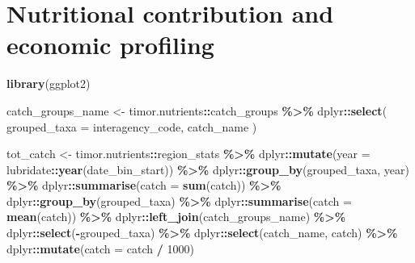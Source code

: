 \documentclass[
]{book}
\newenvironment{Shaded}{\begin{snugshade}}{\end{snugshade}}
\newcommand{\AttributeTok}[1]{\textcolor[rgb]{0.13,0.29,0.53}{#1}}
\newcommand{\DecValTok}[1]{\textcolor[rgb]{0.00,0.00,0.81}{#1}}
\newcommand{\FunctionTok}[1]{\textcolor[rgb]{0.13,0.29,0.53}{\textbf{#1}}}
\newcommand{\NormalTok}[1]{#1}
\newcommand{\OtherTok}[1]{\textcolor[rgb]{0.56,0.35,0.01}{#1}}
\newcommand{\SpecialCharTok}[1]{\textcolor[rgb]{0.81,0.36,0.00}{\textbf{#1}}}
\begin{document}
\chapter{Nutritional contribution and economic profiling}\label{distribution}

\begin{Shaded}
\begin{Highlighting}[]
\FunctionTok{library}\NormalTok{(ggplot2)}


\NormalTok{catch\_groups\_name }\OtherTok{\textless{}{-}}
\NormalTok{  timor.nutrients}\SpecialCharTok{::}\NormalTok{catch\_groups }\SpecialCharTok{\%\textgreater{}\%}
\NormalTok{  dplyr}\SpecialCharTok{::}\FunctionTok{select}\NormalTok{(}
    \AttributeTok{grouped\_taxa =}\NormalTok{ interagency\_code,}
\NormalTok{    catch\_name}
\NormalTok{  )}

\NormalTok{tot\_catch }\OtherTok{\textless{}{-}}
\NormalTok{  timor.nutrients}\SpecialCharTok{::}\NormalTok{region\_stats }\SpecialCharTok{\%\textgreater{}\%}
\NormalTok{  dplyr}\SpecialCharTok{::}\FunctionTok{mutate}\NormalTok{(}\AttributeTok{year =}\NormalTok{ lubridate}\SpecialCharTok{::}\FunctionTok{year}\NormalTok{(date\_bin\_start)) }\SpecialCharTok{\%\textgreater{}\%}
\NormalTok{  dplyr}\SpecialCharTok{::}\FunctionTok{group\_by}\NormalTok{(grouped\_taxa, year) }\SpecialCharTok{\%\textgreater{}\%}
\NormalTok{  dplyr}\SpecialCharTok{::}\FunctionTok{summarise}\NormalTok{(}\AttributeTok{catch =} \FunctionTok{sum}\NormalTok{(catch)) }\SpecialCharTok{\%\textgreater{}\%}
\NormalTok{  dplyr}\SpecialCharTok{::}\FunctionTok{group\_by}\NormalTok{(grouped\_taxa) }\SpecialCharTok{\%\textgreater{}\%}
\NormalTok{  dplyr}\SpecialCharTok{::}\FunctionTok{summarise}\NormalTok{(}\AttributeTok{catch =} \FunctionTok{mean}\NormalTok{(catch)) }\SpecialCharTok{\%\textgreater{}\%}
\NormalTok{  dplyr}\SpecialCharTok{::}\FunctionTok{left\_join}\NormalTok{(catch\_groups\_name) }\SpecialCharTok{\%\textgreater{}\%}
\NormalTok{  dplyr}\SpecialCharTok{::}\FunctionTok{select}\NormalTok{(}\SpecialCharTok{{-}}\NormalTok{grouped\_taxa) }\SpecialCharTok{\%\textgreater{}\%}
\NormalTok{  dplyr}\SpecialCharTok{::}\FunctionTok{select}\NormalTok{(catch\_name, catch) }\SpecialCharTok{\%\textgreater{}\%}
\NormalTok{  dplyr}\SpecialCharTok{::}\FunctionTok{mutate}\NormalTok{(}\AttributeTok{catch =}\NormalTok{ catch }\SpecialCharTok{/} \DecValTok{1000}\NormalTok{)}


\end{Highlighting}
\end{Shaded}
\end{document}
